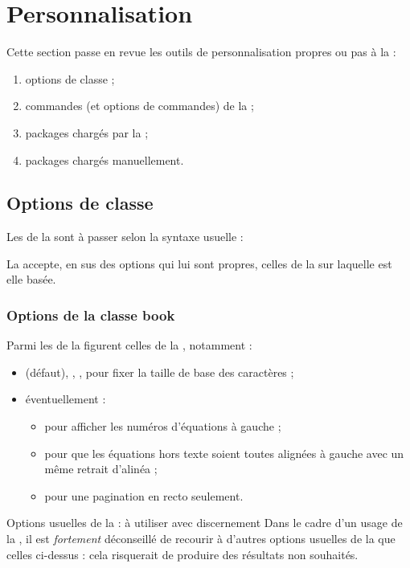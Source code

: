 \chapter{Personnalisation}\label{cha:configuration}

Cette section passe en revue les outils de personnalisation propres ou pas à la
\yatcl{} :
\begin{enumerate}
\item options de classe ;
\item commandes (et options de commandes) de la \yatcl;
\item packages chargés par la \yatcl ;
\item packages chargés manuellement.
\end{enumerate}

\section{Options de classe}\label{options-classe}

Les  de la \yatcl sont à passer selon la syntaxe usuelle :

La \yatcl accepte, en sus des options qui lui sont propres, celles de la
 sur laquelle est elle basée.

\subsection{Options de la classe \textsf{book}}\label{sec:options-usuelles-de}

Parmi les  de la \yatcl figurent celles de la ,
notamment :
\begin{itemize}
\item \docAuxKey{10pt} (défaut), \docAuxKey{11pt}, \docAuxKey{12pt}, pour fixer
  la taille de base des caractères ;
\item éventuellement :
  \begin{itemize}
  \item {} pour afficher les numéros d'équations à gauche ;
  \item {} pour que les équations hors texte soient toutes
    alignées à gauche avec un même retrait d'alinéa ;
  \item {} pour une pagination en recto seulement.
  \end{itemize}
\end{itemize}
\begin{dbwarning}{Options usuelles de la  : à utiliser avec
    discernement}{}
  Dans le cadre d'un usage de la \yatcl, il est \emph{fortement} déconseillé de
  recourir à d'autres options usuelles de la  que celles
  ci-dessus : cela risquerait de produire des résultats non souhaités.
\end{dbwarning}

